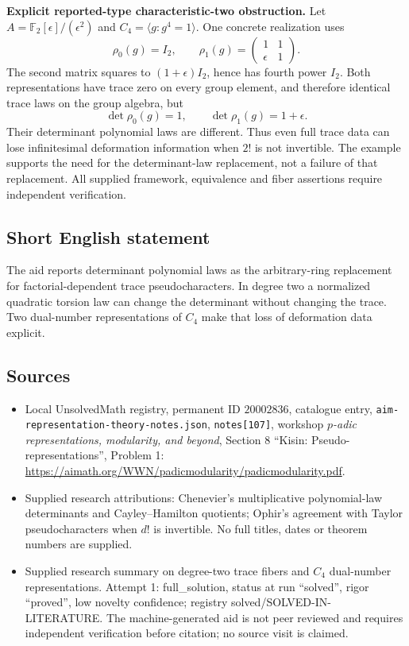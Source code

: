 \documentclass[11pt]{article}
\newcommand{\F}{\mathbb{F}}
\begin{document}
\textbf{Explicit reported-type characteristic-two obstruction.} Let \(A=\F_2[\epsilon]/(\epsilon^2)\) and \(C_4=\langle g:g^4=1\rangle\). One concrete realization uses
\[
 \rho_0(g)=I_2,\qquad
 \rho_1(g)=\begin{pmatrix}1&1\\\epsilon&1\end{pmatrix}.
\]
The second matrix squares to \((1+\epsilon)I_2\), hence has fourth power \(I_2\). Both representations have trace zero on every group element, and therefore identical trace laws on the group algebra, but
\[
 \det\rho_0(g)=1,\qquad\det\rho_1(g)=1+\epsilon.
\]
Their determinant polynomial laws are different. Thus even full trace data can lose infinitesimal deformation information when \(2!\) is not invertible. The example supports the need for the determinant-law replacement, not a failure of that replacement. All supplied framework, equivalence and fiber assertions require independent verification.
\subsection{Short English statement}
The aid reports determinant polynomial laws as the arbitrary-ring replacement for factorial-dependent trace pseudocharacters. In degree two a normalized quadratic torsion law can change the determinant without changing the trace. Two dual-number representations of \(C_4\) make that loss of deformation data explicit.
\subsection{Sources}
\begin{itemize}
\item Local UnsolvedMath registry, permanent ID \(20002836\), catalogue entry, \texttt{aim-representation-theory-notes.json}, \texttt{notes[107]}, workshop \emph{\(p\)-adic representations, modularity, and beyond}, Section 8 ``Kisin: Pseudo-representations'', Problem 1: \url{https://aimath.org/WWN/padicmodularity/padicmodularity.pdf}.
\item Supplied research attributions: Chenevier's multiplicative polynomial-law determinants and Cayley--Hamilton quotients; Ophir's agreement with Taylor pseudocharacters when \(d!\) is invertible. No full titles, dates or theorem numbers are supplied.
\item Supplied research summary on degree-two trace fibers and \(C_4\) dual-number representations. Attempt 1: full\_solution, status at run ``solved'', rigor ``proved'', low novelty confidence; registry solved/SOLVED-IN-LITERATURE. The machine-generated aid is not peer reviewed and requires independent verification before citation; no source visit is claimed.
\end{itemize}
\end{document}

